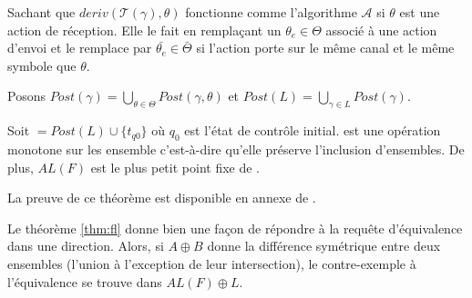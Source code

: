 Sachant que $deriv(\mathcal{T}(\gamma),\theta)$ fonctionne comme l'algorithme $\mathcal{A}$ si $\theta$ est une action de réception. Elle le fait en remplaçant un $\theta_e \in \Theta$ associé à une action d'envoi et le remplace par $\bar{\theta_e} \in \bar{\Theta}$ si l'action porte sur le même canal et le même symbole que $\theta$.

Posons $Post(\gamma)=\bigcup_{\theta\in\Theta}Post(\gamma,\theta)$ et $Post(L)=\bigcup_{\gamma\in L}Post(\gamma)$.


\begin{theorem}\label{thm:fl}
  Soit \fl$=Post(L)\cup\{t_{q0}\}$ où $q_0$ est l'état de contrôle initial. \fl est une opération monotone sur les ensemble c'est-à-dire qu'elle préserve l'inclusion d'ensembles. De plus, $AL(F)$ est le plus petit point fixe de \fl.
\end{theorem}

La preuve de ce théorème est disponible en annexe de \cite{Vardhan04}.

Le théorème \ref{thm:fl} donne bien une façon de répondre à la requête d'équivalence dans une direction. Alors, si $A\oplus B$ donne la différence symétrique entre deux ensembles (l'union à l'exception de leur intersection), le contre-exemple à l'équivalence se trouve dans $AL(F)\oplus L$.

